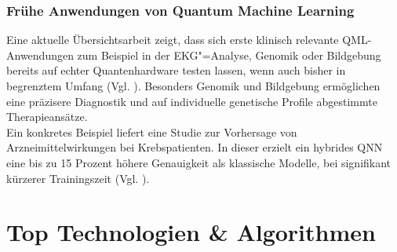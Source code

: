 \subsubsection*{Frühe Anwendungen von Quantum Machine Learning}
Eine aktuelle Übersichtsarbeit zeigt, dass sich erste klinisch relevante QML-Anwendungen zum Beispiel in der EKG"=Analyse, Genomik oder Bildgebung bereits auf echter Quantenhardware testen lassen, wenn auch bisher in begrenztem Umfang (Vgl. \cite{gupta_systematic_2025}). Besonders Genomik und Bildgebung ermöglichen eine präzisere Diagnostik und auf individuelle genetische Profile abgestimmte Therapieansätze.\\

Ein konkretes Beispiel liefert eine Studie zur Vorhersage von Arzneimittelwirkungen bei Krebspatienten. In dieser erzielt ein hybrides QNN eine bis zu 15 Prozent höhere Genauigkeit als klassische Modelle, bei signifikant kürzerer Trainingszeit (Vgl. \cite{sagingalieva_hybrid_2023}).\\

\begin{table}[ht]
\centering
\renewcommand{\arraystretch}{1.3}
\caption{Anwendungsfelder des Quantencomputings in der Medizin und Pharmazie}
\label{tab:qc_medizin}
\end{table}



\section{Top Technologien \& Algorithmen}

